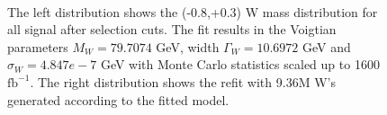\begin{figure}
\begin{minipage}{0.49\textwidth}
     \end{minipage}\\
     \caption{ The left distribution shows the (-0.8,+0.3) W mass distribution for all signal after selection cuts. The fit results in the Voigtian parameters $M_W = 79.7074$ GeV, width $\Gamma_W = 10.6972$ GeV and $\sigma_W = 4.847e-7$ GeV with Monte Carlo statistics scaled up to 1600 $\text{fb}^{-1}$. The right distribution shows the refit with 9.36M W's generated according to the fitted model.}
\label{fig:badfit}


\end{figure}



